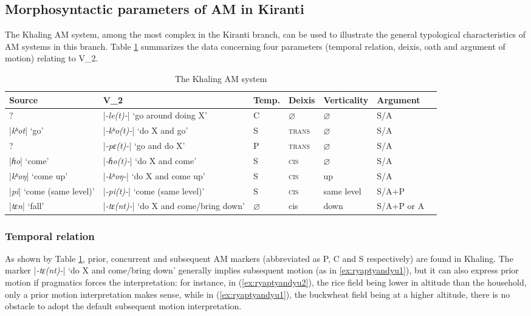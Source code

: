 \documentclass[oneside,a4paper,11pt]{article}
\newcommand{\ipa}[1]{{\phon\textit{#1}}}
\newcommand{\dhatu}[2]{|\ipa{#1}| `#2'}
\begin{document}
\subsection{Morphosyntactic parameters of AM in Kiranti}
The Khaling AM system, among the most complex in the Kiranti branch, can be used to illustrate the general typological characteristics of AM systems in this branch. Table \ref{tab:system} summarizes the data concerning four parameters (temporal relation, deixis, oath and argument of motion) relating to V_2.

\begin{landscape}
\begin{table}%
\caption{The Khaling AM system} \label{tab:system} \centering
\begin{tabular}{lllllll}
\toprule
Source &V_2 & Temp.& Deixis & Verticality & Argument \\
\midrule
?& \dhatu{-le(t)-}{go around doing X} &C& $\varnothing$ & $\varnothing$ & S/A \\
\dhatu{kʰot}{go} &\dhatu{-kʰo(t)-}{do X and go} &S& \textsc{trans} & $\varnothing$ & S/A \\
?&\dhatu{-pɛ(t)-}{go and do X} &P& \textsc{trans} & $\varnothing$ & S/A \\
\dhatu{ɦo}{come} &\dhatu{-ɦo(t)-}{do X and come} &S& \textsc{cis} & $\varnothing$ & S/A \\
\dhatu{kʰoŋ}{come up}&\dhatu{-kʰoŋ-}{do X and come up} &S& \textsc{cis} &up & S/A \\
 \dhatu{pi}{come (same level)}&\dhatu{-pi(t)-}{come (same level)} &S& \textsc{cis} &same level & S/A+P \\
\dhatu{tɛn}{fall} & \dhatu{-tɛ(nt)-}{do X and come/bring down} &$\varnothing$ & cis &down & S/A+P or A \\
\bottomrule
\end{tabular}
\end{table}
\end{landscape}

 \subsubsection{Temporal relation} \label{sec:temporal.khaling}
As shown by Table \ref{tab:system}, prior, concurrent and subsequent AM markers (abbreviated as P, C and S respectively) are found in Khaling. The marker  \dhatu{-tɛ(nt)-}{do X and come/bring down} generally implies subsequent motion (as in \ref{ex:ryaptyandyu1}), but it can also express prior motion if pragmatics forces the interpretation: for instance, in (\ref{ex:ryaptyandyu2}), the rice field being lower in altitude than the household, only a prior motion interpretation makes sense, while in (\ref{ex:ryaptyandyu1}), the buckwheat field being at a higher altitude, there is no obstacle to adopt the default subsequent motion interpretation.
\end{document}
